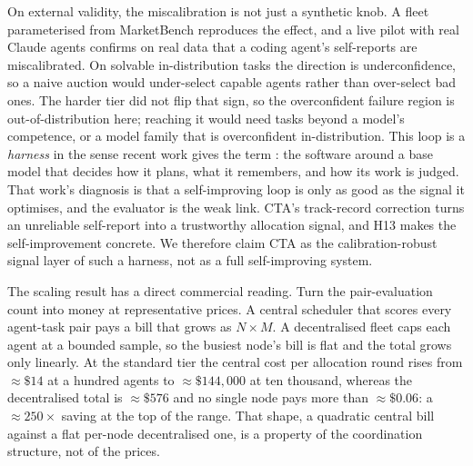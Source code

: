 \documentclass[11pt]{article}
\begin{document}
On external validity, the miscalibration is not just a synthetic knob. A fleet parameterised from MarketBench reproduces the effect, and a live pilot with real Claude agents confirms on real data that a coding agent's self-reports are miscalibrated. On solvable in-distribution tasks the direction is underconfidence, so a naive auction would under-select capable agents rather than over-select bad ones. The harder tier did not flip that sign, so the overconfident failure region is out-of-distribution here; reaching it would need tasks beyond a model's competence, or a model family that is overconfident in-distribution. This loop is a \emph{harness} in the sense recent work gives the term \citep{weng2026harness}: the software around a base model that decides how it plans, what it remembers, and how its work is judged. That work's diagnosis is that a self-improving loop is only as good as the signal it optimises, and the evaluator is the weak link. CTA's track-record correction turns an unreliable self-report into a trustworthy allocation signal, and H13 makes the self-improvement concrete. We therefore claim CTA as the calibration-robust signal layer of such a harness, not as a full self-improving system.

The scaling result has a direct commercial reading. Turn the pair-evaluation count into money at representative prices. A central scheduler that scores every agent-task pair pays a bill that grows as $N\times M$. A decentralised fleet caps each agent at a bounded sample, so the busiest node's bill is flat and the total grows only linearly. At the standard tier the central cost per allocation round rises from $\approx\$14$ at a hundred agents to $\approx\$144{,}000$ at ten thousand, whereas the decentralised total is $\approx\$576$ and no single node pays more than $\approx\$0.06$: a $\approx 250\times$ saving at the top of the range. That shape, a quadratic central bill against a flat per-node decentralised one, is a property of the coordination structure, not of the prices.
\end{document}
